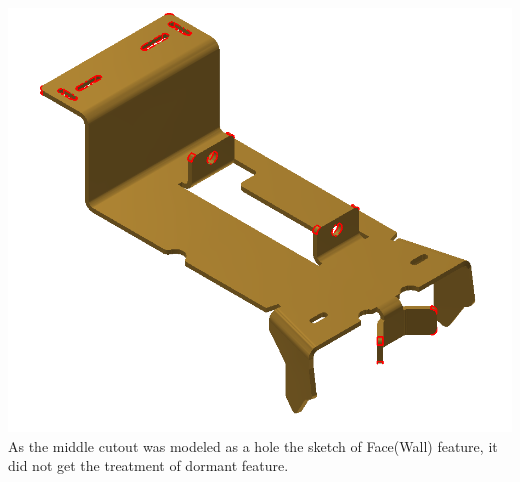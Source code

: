 \begin{minipage}{\linewidth}
\begin{minipage}[c]{0.62\linewidth}
\includegraphics[width=\linewidth,valign=t]{../Common/images/CommercialBracket_PhI_model}
 \label{fig:results:CommercialBracket_PhImodel}
As the middle cutout was modeled as a hole the sketch of Face(Wall) feature, it did not get the treatment of dormant feature. 
\end{minipage}
\quad
\begin{minipage}[c]{0.3\linewidth}

\end{minipage}
\end{minipage}
